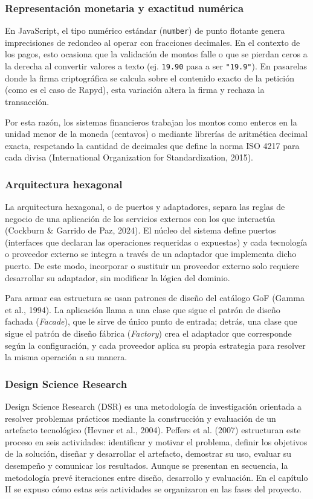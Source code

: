\subsubsection{Representación monetaria y exactitud numérica}
En JavaScript, el tipo numérico estándar (\texttt{number}) de punto flotante genera imprecisiones de redondeo al operar con fracciones decimales. En el contexto de los pagos, esto ocasiona que la validación de montos falle o que se pierdan ceros a la derecha al convertir valores a texto (ej. \texttt{19.90} pasa a ser \texttt{"19.9"}). En pasarelas donde la firma criptográfica se calcula sobre el contenido exacto de la petición (como es el caso de Rapyd), esta variación altera la firma y rechaza la transacción.

Por esta razón, los sistemas financieros trabajan los montos como enteros en la unidad menor de la moneda (centavos) o mediante librerías de aritmética decimal exacta, respetando la cantidad de decimales que define la norma ISO 4217 para cada divisa (International Organization for Standardization, 2015).

\subsubsection{Arquitectura hexagonal}
La arquitectura hexagonal, o de puertos y adaptadores, separa las reglas de negocio de una aplicación de los servicios externos con los que interactúa (Cockburn \& Garrido de Paz, 2024). El núcleo del sistema define puertos (interfaces que declaran las operaciones requeridas o expuestas) y cada tecnología o proveedor externo se integra a través de un adaptador que implementa dicho puerto. De este modo, incorporar o sustituir un proveedor externo solo requiere desarrollar su adaptador, sin modificar la lógica del dominio.

Para armar esa estructura se usan patrones de diseño del catálogo GoF (Gamma et al., 1994). La aplicación llama a una clase que sigue el patrón de diseño fachada (\textit{Facade}), que le sirve de único punto de entrada; detrás, una clase que sigue el patrón de diseño fábrica (\textit{Factory}) crea el adaptador que corresponde según la configuración, y cada proveedor aplica su propia estrategia para resolver la misma operación a su manera.

\subsubsection{Design Science Research}
Design Science Research (DSR) es una metodología de investigación orientada a resolver problemas prácticos mediante la construcción y evaluación de un artefacto tecnológico (Hevner et al., 2004). Peffers et al. (2007) estructuran este proceso en seis actividades: identificar y motivar el problema, definir los objetivos de la solución, diseñar y desarrollar el artefacto, demostrar su uso, evaluar su desempeño y comunicar los resultados. Aunque se presentan en secuencia, la metodología prevé iteraciones entre diseño, desarrollo y evaluación. En el capítulo II se expuso cómo estas seis actividades se organizaron en las fases del proyecto.

